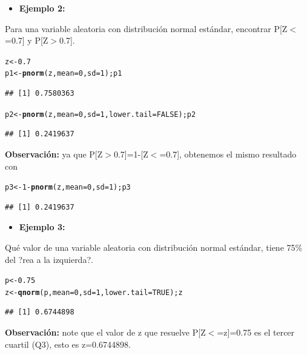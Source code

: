 \documentclass[12pt,letterpaper]{article}\usepackage[]{graphicx}\usepackage[]{color}
\makeatletter
\newcommand{\hlnum}[1]{\textcolor[rgb]{0.686,0.059,0.569}{#1}}%
\newcommand{\hlopt}[1]{\textcolor[rgb]{0,0,0}{#1}}%
\newcommand{\hlstd}[1]{\textcolor[rgb]{0.345,0.345,0.345}{#1}}%
\newcommand{\hlkwb}[1]{\textcolor[rgb]{0.69,0.353,0.396}{#1}}%
\newcommand{\hlkwc}[1]{\textcolor[rgb]{0.333,0.667,0.333}{#1}}%
\newcommand{\hlkwd}[1]{\textcolor[rgb]{0.737,0.353,0.396}{\textbf{#1}}}%
\newenvironment{kframe}{%
 \def\at@end@of@kframe{}%
 \ifinner\ifhmode%
  \def\at@end@of@kframe{\end{minipage}}%
  \begin{minipage}{\columnwidth}%
 \fi\fi%
 \def\FrameCommand##1{\hskip\@totalleftmargin \hskip-\fboxsep
 \colorbox{shadecolor}{##1}\hskip-\fboxsep
     \hskip-\linewidth \hskip-\@totalleftmargin \hskip\columnwidth}%
 \MakeFramed {\advance\hsize-\width
   \@totalleftmargin\z@ \linewidth\hsize
   \@setminipage}}%
 {\par\unskip\endMakeFramed%
 \at@end@of@kframe}
\newenvironment{knitrout}{}{} %
\makeatother
\begin{document}
\begin{itemize}
  \item \textbf{Ejemplo 2:}
\end{itemize}
Para una variable aleatoria con distribuci\'on normal est\'andar, encontrar 
P[Z$<$=0.7] y P[Z$>$0.7]. 
\begin{knitrout}
\color{fgcolor}\begin{kframe}
\begin{alltt}
\hlstd{z} \hlkwb{<-} \hlnum{0.7}
\hlstd{p1} \hlkwb{<-} \hlkwd{pnorm}\hlstd{(z,} \hlkwc{mean}\hlstd{=}\hlnum{0}\hlstd{,} \hlkwc{sd}\hlstd{=}\hlnum{1}\hlstd{); p1}
\end{alltt}
\begin{verbatim}
## [1] 0.7580363
\end{verbatim}
\begin{alltt}
\hlstd{p2} \hlkwb{<-} \hlkwd{pnorm}\hlstd{(z,} \hlkwc{mean}\hlstd{=}\hlnum{0}\hlstd{,} \hlkwc{sd}\hlstd{=}\hlnum{1}\hlstd{,} \hlkwc{lower.tail}\hlstd{=}\hlnum{FALSE}\hlstd{); p2}
\end{alltt}
\begin{verbatim}
## [1] 0.2419637
\end{verbatim}
\end{kframe}
\end{knitrout}
\textbf{Observaci\'on:} ya que P[Z$>$0.7]=1-[Z$<$=0.7], obtenemos el mismo resultado con
\begin{knitrout}
\color{fgcolor}\begin{kframe}
\begin{alltt}
\hlstd{p3} \hlkwb{<-} \hlnum{1}\hlopt{-}\hlkwd{pnorm}\hlstd{(z,} \hlkwc{mean}\hlstd{=}\hlnum{0}\hlstd{,} \hlkwc{sd}\hlstd{=}\hlnum{1}\hlstd{);p3}
\end{alltt}
\begin{verbatim}
## [1] 0.2419637
\end{verbatim}
\end{kframe}
\end{knitrout}

\begin{itemize}
  \item \textbf{Ejemplo 3:}
\end{itemize}
Qu\'e valor de una variable aleatoria con distribuci\'on normal est\'andar, tiene 75\% 
del ?rea a la izquierda?. 
\begin{knitrout}
\color{fgcolor}\begin{kframe}
\begin{alltt}
\hlstd{p} \hlkwb{<-} \hlnum{0.75}
\hlstd{z} \hlkwb{<-} \hlkwd{qnorm}\hlstd{(p,} \hlkwc{mean}\hlstd{=}\hlnum{0}\hlstd{,} \hlkwc{sd}\hlstd{=}\hlnum{1}\hlstd{,} \hlkwc{lower.tail} \hlstd{=} \hlnum{TRUE}\hlstd{); z}
\end{alltt}
\begin{verbatim}
## [1] 0.6744898
\end{verbatim}
\end{kframe}
\end{knitrout}
\textbf{Observaci\'on:} note que el valor de z que resuelve P[Z$<$=z]=0.75 es el tercer cuartil (Q3), esto es z=0.6744898.
\end{document}
